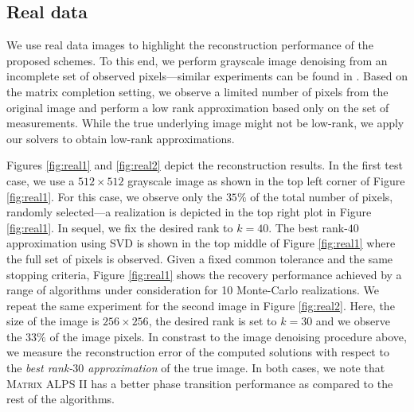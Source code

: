 \documentclass[twocolumn]{svjour3}
\newcommand{\rank}{k}
\begin{document}
\subsection{Real data}

We use real data images to highlight the reconstruction performance of the proposed schemes. To this end, we perform grayscale image denoising from an incomplete set of observed pixels---similar experiments can be found in \cite{LMatFit}. Based on the matrix completion setting, we observe a limited number of pixels from the original image and perform a low rank approximation based only on the set of measurements. While the true underlying image might not be low-rank, we apply our solvers to obtain low-rank approximations.

Figures \ref{fig:real1} and \ref{fig:real2} depict the reconstruction results. In the first test case, we use a $512 \times 512$ grayscale image as shown in the top left corner of Figure \ref{fig:real1}. For this case, we observe only the $35\%$ of the total number of pixels, randomly selected---a realization is depicted in the top right plot in Figure \ref{fig:real1}. In sequel, we fix the desired rank to $\rank = 40$. The best rank-$40$ approximation using SVD is shown in the top middle of Figure \ref{fig:real1} where the full set of pixels is observed. Given a fixed common tolerance and the same stopping criteria, Figure \ref{fig:real1} shows the recovery performance achieved by a range of algorithms under consideration for 10 Monte-Carlo realizations.  We repeat the same experiment for the second image in Figure \ref{fig:real2}. Here, the size of the image is $256 \times 256$, the desired rank is set to $\rank = 30$ and we observe the $33\%$ of the image pixels. In constrast to the image denoising procedure above, we measure the reconstruction error of the computed solutions with respect to the {\it best rank-$30$ approximation} of the true image. In both cases,  we note that \textsc{Matrix ALPS II} has a better phase transition performance as compared to the rest of the algorithms.
\end{document}
